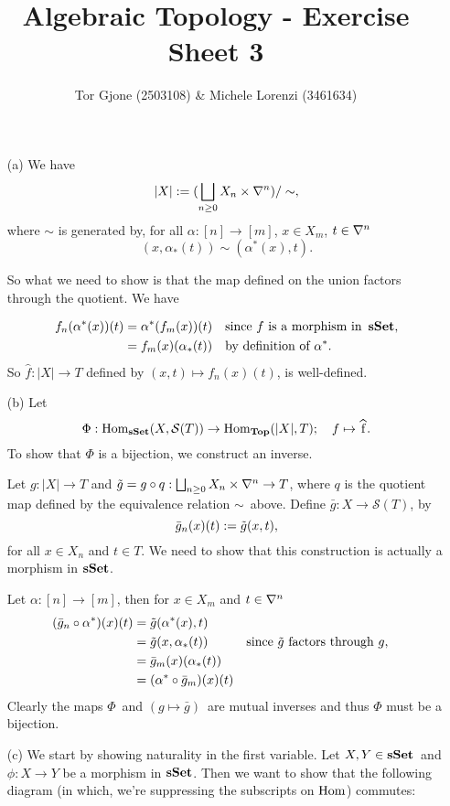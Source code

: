 \documentclass[a4paper,11pt,english]{article}
\title{\textbf{Algebraic Topology} - Exercise Sheet 3}
\author{Tor Gjone (2503108) \& Michele Lorenzi (3461634)}
\renewcommand{\S}[1]{\mathcal{S}(#1)}
\begin{document}
\mmaketitle


\begin{exercise}[1]

\begin{enumerate}

\item[(a)]
We have 
\[ |X| := (\bigsqcup_{n\ge 0} X_n \times \nabla^n ) / \sim,  \]
where $\sim$ is generated by, for all $\alpha: [n]\to[m]$, $x\in X_m$, $t \in
\nabla^n$
\[ (x,\alpha_*(t)) \sim (\alpha^*(x), t). \]

So what we need to show is that the map defined on the union factors through the
quotient. We have

\begin{align*}
f_n(\alpha^*(x))(t) &= \alpha^*(f_m(x)) (t)
&& \text{since } f \text{ is a morphism
in } \operatorname{{\bf sSet}}, \\
&= f_m(x)(\alpha_*(t)) 
&&\text{by definition of } \alpha^*.
\end{align*}
So $\hat{f}: |X| \to T$ defined by $(x,t) \mapsto f_n(x)(t)$, is well-defined.

\item[(b)]
Let 
\[ \Phi: \Hom_{\sSet}(X, \S T) \to \Hom_{\Top} (|X|, T); \quad f \mapsto \hat f. \]
To show that $\Phi$ is a bijection, we construct an inverse. 

Let $g: |X| \to T$ and $\tilde g = g \circ q: \bigsqcup_{n\ge 0} X_n\times \nabla^n \to
T$, where $q$ is the quotient map defined by the equivalence relation
$\sim$ above. Define $\bar g: X \to \S T$, by 
\[ \bar g_n (x)(t) := \tilde g(x,t),  \]
for all $x \in X_n$ and $t\in T$. We need to show that this construction is actually a morphism in $\operatorname{{\bf sSet}}$. 

Let $\alpha: [n]\to[m]$, then for $x\in X_m$ and $t \in \nabla^n$
\begin{align*}
(\bar g_n \circ \alpha^*)(x)(t) &= \tilde g(\alpha^*(x), t) \\
&= \tilde g (x, \alpha_*(t)) && \text{since } \tilde g \text{ factors through } g, \\
&= \bar g_m (x)(\alpha_*(t)) \\
&= (\alpha^* \circ \bar g_m)(x)(t)
\end{align*}
Clearly the maps $\Phi$ and $(g \mapsto \bar g)$ are mutual inverses and thus
$\Phi$ must be a bijection.

\item[(c)]
We start by showing naturality in the first variable. 
Let $X,Y \in \operatorname{{\bf sSet}}$ and $\phi : X \to Y$ be a morphism in $\operatorname{{\bf sSet}}$. Then we want
to show that the following diagram (in which, we're suppressing the subscripts on
$\operatorname{Hom}$) commutes:


\end{enumerate}
\end{exercise}
\end{document}
